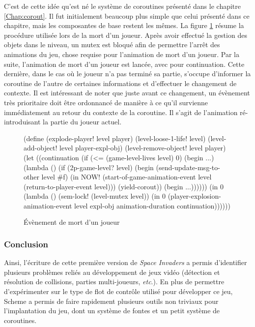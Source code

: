 \documentclass[12pt,twoside,letterpaper,francais]{book}
\newcommand{\scheme}[1]{\selectlanguage{english}{\tt #1}\selectlanguage{french}}
\begin{document}
C'est de cette idée qu'est né le système de coroutines présenté dans
le chapitre \ref{Chap:corout}. Il fut initialement beaucoup plus
simple que celui présenté dans ce chapitre, mais les composantes de
base restent les mêmes. La figure \ref{Exp:si-mort} résume la
procédure utilisée lors de la mort d'un joueur. Après avoir effectué
la gestion des objets dans le niveau, un mutex est bloqué afin de
permettre l'arrêt des animations du jeu, chose requise pour
l'animation de mort d'un joueur. Par la suite, l'animation de mort
d'un joueur est lancée, avec \scheme{continuation} pour
continuation. Cette dernière, dans le cas où le joueur n'a pas terminé
sa partie, s'occupe d'informer la coroutine de l'autre de certaines
informations et d'effectuer le changement de contexte. Il est
intéressant de noter que juste avant ce changement, un évènement très
prioritaire doit être ordonnancé de manière à ce qu'il survienne
immédiatement au retour du contexte de la coroutine. Il s'agit de
l'animation ré-introduisant la partie du joueur actuel.\\

\begin{figure}[htb!]
  \begin{schemecode}
(define (explode-player! level player)
  (level-loose-1-life! level)
  (level-add-object! level player-expl-obj)
  (level-remove-object! level player)
  (let ((continuation
         (if (<= (game-level-lives level) 0)
             (begin ...)
             (lambda ()
               (if (2p-game-level? level)
                   (begin
                     (send-update-msg-to-other level \#f)
                     (in NOW! (start-of-game-animation-event
                               level (return-to-player-event level)))
                     (yield-corout))
                   (begin ...))))))
     (in 0 (lambda ()
            (sem-lock! (level-mutex level))
            (in 0 (player-explosion-animation-event
                   level expl-obj animation-duration continuation))))))
   \end{schemecode}
  \caption{Évènement de mort d'un joueur}
  \label{Exp:si-mort}
\end{figure}


\FloatBarrier
\subsubsection{Conclusion}
Ainsi, l'écriture de cette première version de \textit{Space Invaders} a permis
d'identifier plusieurs problèmes reliés au dévelop\-pement de jeux vidéo
(détection et résolution de collisions, parties multi-joueurs,
\textit{etc}.). En plus de permettre d'expérimenter sur le type de flot de
contrôle utilisé pour développer ce jeu, Scheme a permis de faire
rapidement plusieurs outils non triviaux pour l'implantation du jeu,
dont un système de fontes et un petit système de coroutines.
\end{document}
